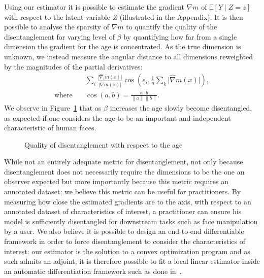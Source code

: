 Using our estimator it is possible to estimate the gradient $\nabla m$ of $\mathbb{E} [ Y \mid Z = z ]$ with respect to the latent variable $Z$ (illustrated in the Appendix). It is then possible to analyse the sparsity of $\nabla m$ to quantify the quality of the disentanglement for varying level of $\beta$ by quantifying how far from a single dimension the gradient for the age is concentrated. As the true dimension is unknown, we instead measure the angular distance to all dimensions reweighted by the magnitudes of the partial derivatives:
\begin{equation}
    \begin{split}
        &\sum_i \frac{\lvert\hat \nabla_i m(x) \rvert}{\lvert \hat \nabla m(x) \rvert} \cos (e_i, \frac{1}{n} \sum_k \lvert \hat \nabla m(x) \rvert), \\
        \text{where} \quad &\cos (a, b) = \frac{a \cdot b}{\lVert a \rVert \lVert b \rVert}.
    \end{split}
\end{equation}
We observe in Figure~\ref{fig:disentangle} that as $\beta$ increases the age slowly become disentangled, as expected if one considers the age to be an important and independent characteristic of human faces.
\begin{figure}[H]
    \centering
    
    \caption{Quality of disentanglement with respect to the age} \label{fig:disentangle}
\end{figure}

While not an entirely adequate metric for disentanglement, not only because disentanglement does not necessarily require the dimensions to be the one an observer expected but more importantly because this metric requires an annotated dataset; we believe this metric can be useful for practitioners. By measuring how close the estimated gradients are to the axis, with respect to an annotated dataset of characteristics of interest, a practitioner can ensure his model is sufficiently disentangled for downstream tasks such as face manipulation by a user. We also believe it is possible to design an end-to-end differentiable framework in order to force disentanglement to consider the characteristics of interest: our estimator is the solution to a convex optimization program and as such admits an adjoint; it is therefore possible to fit a local linear estimator inside an automatic differentiation framework such as done in~\cite{agrawalDifferentiableConvexOptimization2019}.
